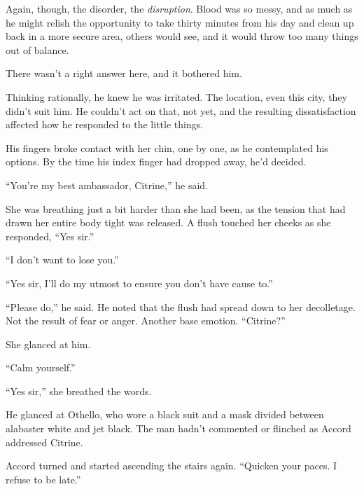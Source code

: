 Again, though, the disorder, the \emph{disruption}.  Blood was so messy, and as much as he might relish the opportunity to take thirty minutes from his day and clean up back in a more secure area, others would see, and it would throw too many things out of balance.



There wasn't a right answer here, and it bothered him.



Thinking rationally, he knew he was irritated.  The location, even this city, they didn't suit him.  He couldn't act on that, not yet, and the resulting dissatisfaction affected how he responded to the little things.



His fingers broke contact with her chin, one by one, as he contemplated his options.  By the time his index finger had dropped away, he'd decided.



``You're my best ambassador, Citrine,'' he said.



She was breathing just a bit harder than she had been, as the tension that had drawn her entire body tight was released.  A flush touched her cheeks as she responded, ``Yes sir.''



``I don't want to lose you.''



``Yes sir, I'll do my utmost to ensure you don't have cause to.''



``Please do,'' he said.  He noted that the flush had spread down to her decolletage.  Not the result of fear or anger.  Another base emotion.  ``Citrine?''



She glanced at him.



``Calm yourself.''



``Yes sir,'' she breathed the words.



He glanced at Othello, who wore a black suit and a mask divided between alabaster white and jet black.  The man hadn't commented or flinched as Accord addressed Citrine.



Accord turned and started ascending the stairs again.  ``Quicken your paces.  I refuse to be late.''



